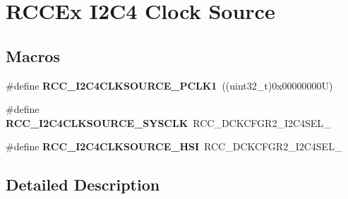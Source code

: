\hypertarget{group___r_c_c_ex___i2_c4___clock___source}{}\section{R\+C\+C\+Ex I2\+C4 Clock Source}
\label{group___r_c_c_ex___i2_c4___clock___source}
\subsection*{Macros}
\begin{DoxyCompactItemize}
\item 
\mbox{\label{group___r_c_c_ex___i2_c4___clock___source_gaf9b67501660628577dd542c187b58d29}} 
\#define {\bfseries R\+C\+C\+\_\+\+I2\+C4\+C\+L\+K\+S\+O\+U\+R\+C\+E\+\_\+\+P\+C\+L\+K1}~((uint32\+\_\+t)0x00000000\+U)
\item 
\mbox{\label{group___r_c_c_ex___i2_c4___clock___source_ga7b38b1dbd180a2e0c6a97a0c8a3f068c}} 
\#define {\bfseries R\+C\+C\+\_\+\+I2\+C4\+C\+L\+K\+S\+O\+U\+R\+C\+E\+\_\+\+S\+Y\+S\+C\+LK}~R\+C\+C\+\_\+\+D\+C\+K\+C\+F\+G\+R2\+\_\+\+I2\+C4\+S\+E\+L\+\_
\item 
\mbox{\label{group___r_c_c_ex___i2_c4___clock___source_gab3544835d7916cd3316a12bd1d9a6f11}} 
\#define {\bfseries R\+C\+C\+\_\+\+I2\+C4\+C\+L\+K\+S\+O\+U\+R\+C\+E\+\_\+\+H\+SI}~R\+C\+C\+\_\+\+D\+C\+K\+C\+F\+G\+R2\+\_\+\+I2\+C4\+S\+E\+L\+\_
\end{DoxyCompactItemize}


\subsection{Detailed Description}
